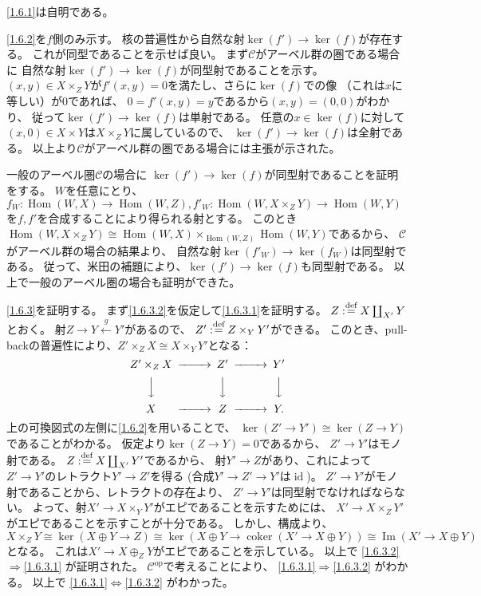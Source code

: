 \documentclass[uplatex,dvipdfmx]{jsarticle}
\makeatletter
\theoremstyle{definition}
\renewenvironment{proof}[1][\proofname]{
  \pushQED{\qed}%
  \normalfont \topsep6\p@\@plus6\p@\relax
  \trivlist
  \item[\hskip\labelsep
    #1\@addpunct{\textbf{.}}]\ignorespaces
}{%
  \popQED\endtrivlist\@endpefalse
}
\providecommand{\proofname}{証明}
\DeclareMathOperator{\Hom}{\mathrm{Hom}}
\DeclareMathOperator{\id}{\mathrm{id}}
\DeclareMathOperator{\im}{\mathrm{Im}}
\newcommand{\op}{\mathrm{op}}
\DeclareMathOperator{\coker}{\mathrm{coker}}
\newcommand\mcC{\mathcal{C}}
\def\dfn{:\overset{\mbox{{\scriptsize def}}}{=}}
\makeatother
\begin{document}
\begin{proof}
  \ref{1.6.1}は自明である。

  \ref{1.6.2}を\(f\)側のみ示す。
  核の普遍性から自然な射\(\ker(f')\to \ker(f)\)が存在する。
  これが同型であることを示せば良い。
  まず\(\mcC\)がアーベル群の圏である場合に
  自然な射\(\ker(f')\to \ker(f)\)が同型射であることを示す。
  \((x,y)\in X\times_ZY\)が\(f'(x,y)=0\)を満たし、さらに\(\ker(f)\)での像
  （これは\(x\)に等しい）が\(0\)であれば、
  \(0 = f'(x,y) = y\)であるから\((x,y) = (0,0)\)がわかり、
  従って\(\ker(f')\to \ker(f)\)は単射である。
  任意の\(x\in \ker(f)\)に対して
  \((x,0)\in X\times Y\)は\(X\times_ZY\)に属しているので、
  \(\ker(f')\to \ker(f)\)は全射である。
  以上より\(\mcC\)がアーベル群の圏である場合には主張が示された。

  一般のアーベル圏\(\mcC\)の場合に
  \(\ker(f')\to \ker(f)\)が同型射であることを証明をする。
  \(W\)を任意にとり、
  \(f_W:\Hom(W,X)\to \Hom(W,Z), f'_W:\Hom(W,X\times_ZY)\to \Hom(W,Y)\)
  を\(f,f'\)を合成することにより得られる射とする。
  このとき\(\Hom(W,X\times_ZY)\cong \Hom(W,X)\times_{\Hom(W,Z)}\Hom(W,Y)\)であるから、
  \(\mcC\)がアーベル群の場合の結果より、
  自然な射\(\ker(f'_W)\to \ker(f_W)\)は同型射である。
  従って、米田の補題により、\(\ker(f')\to \ker(f)\)も同型射である。
  以上で一般のアーベル圏の場合も証明ができた。

  \ref{1.6.3}を証明する。
  まず\ref{1.6.3.2}を仮定して\ref{1.6.3.1}を証明する。
  \(Z\dfn X\coprod_{X'}Y\)とおく。
  射\(Z\to Y\xleftarrow{g} Y'\)があるので、
  \(Z'\dfn Z\times_YY'\)ができる。
  このとき、pull-backの普遍性により、\(Z'\times_Z X \cong X\times_YY'\)となる：
  \[
  \begin{CD}
    Z'\times_Z X @>>> Z' @>>> Y' \\
    @VVV @VVV @VVV \\
    X @>>> Z @>>> Y.
  \end{CD}
  \]
  上の可換図式の左側に\ref{1.6.2}を用いることで、
  \(\ker(Z'\to Y')\cong \ker(Z\to Y)\)であることがわかる。
  仮定より\(\ker(Z\to Y) = 0\)であるから、
  \(Z'\to Y'\)はモノ射である。
  \(Z \dfn X\coprod_{X'}Y'\)であるから、
  射\(Y'\to Z\)があり、これによって\(Z'\to Y'\)のレトラクト\(Y'\to Z'\)を得る
  (合成\(Y'\to Z'\to Y'\)は\(\id\))。
  \(Z'\to Y'\)がモノ射であることから、レトラクトの存在より、
  \(Z'\to Y'\)は同型射でなければならない。
  よって、射\(X'\to X\times_YY'\)がエピであることを示すためには、
  \(X'\to X\times_ZY'\)がエピであることを示すことが十分である。
  しかし、構成より、
  \[
  X\times_ZY \cong \ker(X\oplus Y \to Z)
  \cong \ker(X\oplus Y \to \coker(X' \to X\oplus Y))
  \cong \im(X' \to X\oplus Y)
  \]
  となる。
  これは\(X'\to X\oplus_ZY\)がエピであることを示している。
  以上で
  \ref{1.6.3.2}\(\Rightarrow\)\ref{1.6.3.1}
  が証明された。
  \(\mcC^{\op}\)で考えることにより、
  \ref{1.6.3.1}\(\Rightarrow\)\ref{1.6.3.2}
  がわかる。
  以上で
  \ref{1.6.3.1}\(\Leftrightarrow\)\ref{1.6.3.2}
  がわかった。


\end{proof}
\end{document}
